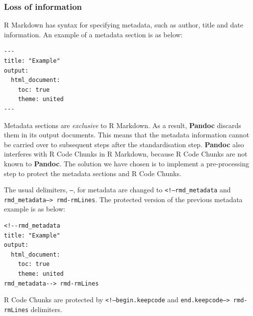 \documentclass[a4paper, 12pt]{report}
\begin{document}
%
%
%

\subsubsection*{Loss of information}
R Markdown has syntax for specifying metadata, such as author, title and date information. An example of a metadata section is as below:
\begin{lstlisting}[numbers=none, frame=none]
---
title: "Example"
output:
  html_document:
    toc: true
    theme: united
---
\end{lstlisting}

Metadata sections are \emph{exclusive} to R Markdown. As a result, \textbf{Pandoc} discards them in its output documents. This means that the metadata information cannot be carried over to subsequent steps after the standardisation step. \textbf{Pandoc} also interferes with R Code Chunks in R Markdown, because R Code Chunks are not known to \textbf{Pandoc}.  The solution we have chosen is to implement a pre-processing step to protect the metadata sections and R Code Chunks.

The usual delimiters, \texttt{---}, for metadata are changed to \texttt{<!--rmd\_metadata} and \texttt{rmd\_metadata--> rmd-rmLines}. The protected version of the previous metadata example is as below:
\begin{lstlisting}[numbers=none, frame=none]
<!--rmd_metadata
title: "Example"
output:
  html_document:
    toc: true
    theme: united
rmd_metadata--> rmd-rmLines
\end{lstlisting}

R Code Chunks are protected by \texttt{<!--begin.keepcode} and \texttt{end.keepcode--> rmd-rmLines} delimiters.
\end{document}
